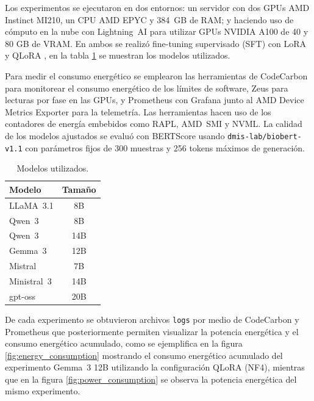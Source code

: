 \documentclass[twocolumn]{article}
\begin{document}
{Los experimentos se ejecutaron en dos entornos: un servidor con dos GPUs AMD Instinct MI210, un CPU AMD EPYC y 384~GB de RAM; y haciendo uso de cómputo en la nube con Lightning~AI \cite{lightning2023} para utilizar GPUs NVIDIA A100 de 40 y 80 GB de VRAM. En ambos se realizó fine-tuning supervisado (SFT) \cite{trlsft2024} con LoRA \cite{Lora} y QLoRA \cite{qlora2023}, en la tabla \ref{tab:models} se muestran los modelos utilizados.}

{Para medir el consumo energético se emplearon las herramientas de CodeCarbon \cite{benoitcourty202411171501} para monitorear el consumo energético de los límites de software, Zeus \cite{measuringgpuzeus} para lecturas por fase en las GPUs, y Prometheus con Grafana junto al AMD Device Metrics Exporter para la telemetría. Las herramientas hacen uso de los contadores de energía embebidos como RAPL, AMD~SMI y NVML. La calidad de los modelos ajustados se evaluó con BERTScore \cite{bertscore} usando \texttt{dmis-lab/biobert-v1.1} con parámetros fijos de 300 muestras y 256 tokens máximos de generación.}


\begin{table}[htbp]
    \centering
    \caption{Modelos utilizados.}
    \label{tab:models}
    \begin{tabular}{lc}
    \toprule
    \textbf{Modelo} & \textbf{Tamaño}\\
    \midrule
    LLaMA~3.1 & 8B \\
    Qwen~3 & 8B \\
    Qwen~3 & 14B \\
    Gemma~3 & 12B \\
    Mistral & 7B \\
    Ministral~3 & 14B \\
    gpt-oss & 20B \\
    \bottomrule
    \end{tabular}
\end{table}

{De cada experimento se obtuvieron archivos \texttt{logs} por medio de CodeCarbon y Prometheus que posteriormente permiten visualizar la potencia energética y el consumo energético acumulado, como se ejemplifica en la figura \ref{fig:energy_consumption} mostrando el consumo energético acumulado del experimento Gemma~3 12B utilizando la configuración QLoRA (NF4), mientras que en la figura \ref{fig:power_consumption} se observa la potencia energética del mismo experimento.}
\end{document}
